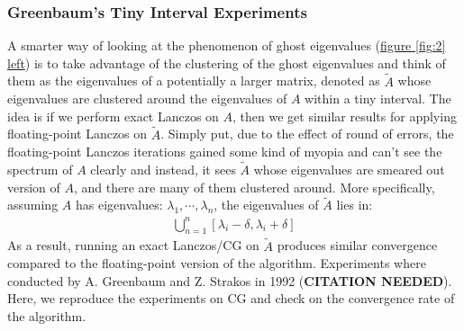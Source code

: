 \documentclass[]{article}
\theoremstyle{definition}
\begin{document}
    \subsubsection{Greenbaum's Tiny Interval Experiments}
        A smarter way of looking at the phenomenon of ghost eigenvalues (\hyperref[fig:2]{figure \ref*{fig:2} left}) is to take advantage of the clustering of the ghost eigenvalues and think of them as the eigenvalues of a potentially a larger matrix, denoted as $\tilde{A}$ whose eigenvalues are clustered around the eigenvalues of $A$ within a tiny interval. The idea is if we perform exact Lanczos on $A$, then we get similar results for applying floating-point Lanczos on $\tilde{A}$. Simply put, due to the effect of round of errors, the floating-point Lanczos iterations gained some kind of myopia and can't see the spectrum of $A$ clearly and instead, it sees $\tilde{A}$ whose eigenvalues are smeared out version of $A$, and there are many of them clustered around. More specifically, assuming $A$ has eigenvalues: $\lambda_1, \cdots, \lambda_n$, the eigenvalues of $\tilde{A}$ lies in: 
        \begin{align}
            \bigcup_{n = 1}^n[\lambda_i - \delta, \lambda_i + \delta]
        \end{align}
        As a result, running an exact Lanczos/CG on $\tilde{A}$ produces similar convergence compared to the floating-point version of the algorithm. Experiments where conducted by A. Greenbaum and Z. Strakos in 1992 (\textbf{CITATION NEEDED}). Here, we reproduce the experiments on CG and check on the convergence rate of the algorithm. 
    
\end{document}
